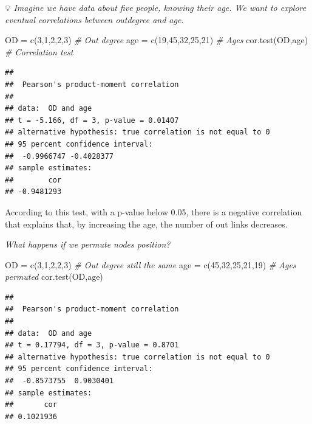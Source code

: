 \documentclass[
  notitlepage,
  onecolumn,
  openany]{book}
\newenvironment{Shaded}{\begin{snugshade}}{\end{snugshade}}
\newcommand{\CommentTok}[1]{\textcolor[rgb]{0.56,0.35,0.01}{\textit{#1}}}
\newcommand{\DecValTok}[1]{\textcolor[rgb]{0.00,0.00,0.81}{#1}}
\newcommand{\FunctionTok}[1]{\textcolor[rgb]{0.00,0.00,0.00}{#1}}
\newcommand{\NormalTok}[1]{#1}
\newcommand{\OtherTok}[1]{\textcolor[rgb]{0.56,0.35,0.01}{#1}}
\begin{document}
💡 \emph{Imagine we have data about five people, knowing their age. We want to explore eventual correlations between outdegree and age.}

\begin{Shaded}
\begin{Highlighting}[]
\NormalTok{OD }\OtherTok{=} \FunctionTok{c}\NormalTok{(}\DecValTok{3}\NormalTok{,}\DecValTok{1}\NormalTok{,}\DecValTok{2}\NormalTok{,}\DecValTok{2}\NormalTok{,}\DecValTok{3}\NormalTok{) }\CommentTok{\# Out degree}
\NormalTok{age }\OtherTok{=} \FunctionTok{c}\NormalTok{(}\DecValTok{19}\NormalTok{,}\DecValTok{45}\NormalTok{,}\DecValTok{32}\NormalTok{,}\DecValTok{25}\NormalTok{,}\DecValTok{21}\NormalTok{) }\CommentTok{\# Ages}
\FunctionTok{cor.test}\NormalTok{(OD,age) }\CommentTok{\# Correlation test}
\end{Highlighting}
\end{Shaded}

\begin{verbatim}
## 
##  Pearson's product-moment correlation
## 
## data:  OD and age
## t = -5.166, df = 3, p-value = 0.01407
## alternative hypothesis: true correlation is not equal to 0
## 95 percent confidence interval:
##  -0.9966747 -0.4028377
## sample estimates:
##        cor 
## -0.9481293
\end{verbatim}

According to this test, with a p-value below 0.05, there is a negative correlation that explains that, by increasing the age, the number of out links decreases.

\emph{What happens if we permute nodes position?}

\begin{Shaded}
\begin{Highlighting}[]
\NormalTok{OD }\OtherTok{=} \FunctionTok{c}\NormalTok{(}\DecValTok{3}\NormalTok{,}\DecValTok{1}\NormalTok{,}\DecValTok{2}\NormalTok{,}\DecValTok{2}\NormalTok{,}\DecValTok{3}\NormalTok{) }\CommentTok{\# Out degree still the same}
\NormalTok{age }\OtherTok{=} \FunctionTok{c}\NormalTok{(}\DecValTok{45}\NormalTok{,}\DecValTok{32}\NormalTok{,}\DecValTok{25}\NormalTok{,}\DecValTok{21}\NormalTok{,}\DecValTok{19}\NormalTok{) }\CommentTok{\# Ages permuted}
\FunctionTok{cor.test}\NormalTok{(OD,age)}
\end{Highlighting}
\end{Shaded}

\begin{verbatim}
## 
##  Pearson's product-moment correlation
## 
## data:  OD and age
## t = 0.17794, df = 3, p-value = 0.8701
## alternative hypothesis: true correlation is not equal to 0
## 95 percent confidence interval:
##  -0.8573755  0.9030401
## sample estimates:
##       cor 
## 0.1021936
\end{verbatim}
\end{document}
